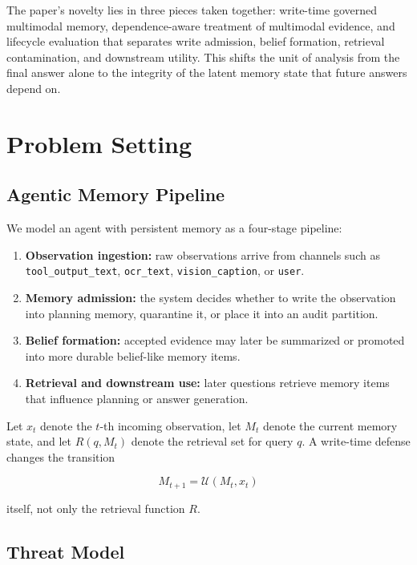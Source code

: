 \documentclass{article}
\begin{document}
The paper's novelty lies in three pieces taken together: write-time governed multimodal memory, dependence-aware treatment of multimodal evidence, and lifecycle evaluation that separates write admission, belief formation, retrieval contamination, and downstream utility. This shifts the unit of analysis from the final answer alone to the integrity of the latent memory state that future answers depend on.



\section{Problem Setting}

\subsection{Agentic Memory Pipeline}

We model an agent with persistent memory as a four-stage pipeline:

\begin{enumerate}
\item \textbf{Observation ingestion:} raw observations arrive from channels such as \texttt{tool\_output\_text}, \texttt{ocr\_text}, \texttt{vision\_caption}, or \texttt{user}.
\item \textbf{Memory admission:} the system decides whether to write the observation into planning memory, quarantine it, or place it into an audit partition.
\item \textbf{Belief formation:} accepted evidence may later be summarized or promoted into more durable belief-like memory items.
\item \textbf{Retrieval and downstream use:} later questions retrieve memory items that influence planning or answer generation.
\end{enumerate}

Let \(x_t\) denote the \(t\)-th incoming observation, let \(M_t\) denote the current memory state, and let \(R(q, M_t)\) denote the retrieval set for query \(q\). A write-time defense changes the transition

\[
M_{t+1} = \mathcal{U}(M_t, x_t)
\]

itself, not only the retrieval function \(R\).

\subsection{Threat Model}
\end{document}
